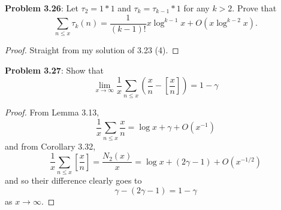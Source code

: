 \documentclass[12pt]{article}
\begin{document}
\fi

\textbf{Problem 3.26}: Let $\tau_2 = 1 * 1$ and $\tau_k = \tau_{k-1} * 1$ for any $k > 2$. Prove that
$$\sum_{n \leq x} \tau_k(n) = \frac{1}{(k-1)!} x \log^{k-1} x + O(x \log^{k-2} x).$$

\begin{proof}
Straight from my solution of 3.23 (4).
\end{proof}

\textbf{Problem 3.27}: Show that
$$\lim_{x \rightarrow \infty} \frac{1}{x} \sum_{n \leq x} \left( \frac{x}{n} - \left[ \frac{x}{n} \right] \right) = 1 - \gamma$$

\begin{proof}
From Lemma 3.13,
$$\frac{1}{x} \sum_{n \leq x} \frac{x}{n} = \log x + \gamma + O(x^{-1})$$
and from Corollary 3.32,
$$\frac{1}{x} \sum_{n \leq x} \left[\frac{x}{n}\right] = \frac{N_2(x)}{x} = \log x + (2\gamma - 1) + O(x^{-1/2})$$
and so their difference clearly goes to
$$\gamma - (2 \gamma - 1) = 1 - \gamma$$
as $x \rightarrow \infty$.
\end{proof}

\unless\ifdefined\IsMainDocument
\end{document}

